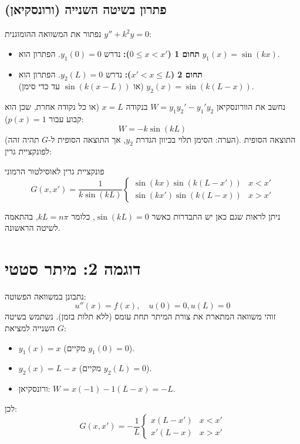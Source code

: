 \subsection{פתרון בשיטה השנייה (ורונסקיאן)}
נפתור את המשוואה ההומוגנית $y'' + k^2 y = 0$:
\begin{itemize}
    \item \textbf{תחום 1 ($0 \le x < x'$):} נדרש $y_1(0)=0$. הפתרון הוא $y_1(x) = \sin(kx)$.
    \item \textbf{תחום 2 ($x' < x \le L$):} נדרש $y_2(L)=0$. הפתרון הוא $y_2(x) = \sin(k(L-x))$ (או $\sin(k(x-L))$ עד כדי סימן).
\end{itemize}
נחשב את הוורונסקיאן $W = y_1 y_2' - y_1' y_2$ בנקודה $x=L$ (או כל נקודה אחרת, שכן הוא קבוע עבור $p(x)=1$):
\begin{equation}
    W = -k\sin(kL)
\end{equation}
(הערה: הסימן תלוי בכיוון הגדרת $y_2$, אך התוצאה הסופית ל-$G$ תהיה זהה).
התוצאה הסופית לפונקציית גרין:
\begin{resultbox}{פונקציית גרין לאוסילטור הרמוני}
    \begin{equation}
        G(x,x') = \frac{1}{k\sin(kL)} \begin{cases} 
            \sin(kx)\sin(k(L-x')) & x < x' \\
            \sin(kx')\sin(k(L-x)) & x > x'
        \end{cases}
    \end{equation}
\end{resultbox}
ניתן לראות שגם כאן יש התבדרות כאשר $\sin(kL)=0$, כלומר $kL = n\pi$, בהתאמה לשיטה הראשונה.

\section{דוגמה 2: מיתר סטטי}

נתבונן במשוואה הפשוטה:
\begin{equation}
    u''(x) = f(x), \quad u(0)=0, u(L)=0
\end{equation}
זוהי משוואה המתארת את צורת המיתר תחת עומס (ללא תלות בזמן).
נשתמש בשיטה השנייה למציאת $G$:
\begin{itemize}
    \item $y_1(x) = x$ (מקיים $y_1(0)=0$).
    \item $y_2(x) = L-x$ (מקיים $y_2(L)=0$).
    \item ורונסקיאן: $W = x(-1) - 1(L-x) = -L$.
\end{itemize}
לכן:
\begin{equation}
    G(x,x') = -\frac{1}{L} \begin{cases} x(L-x') & x < x' \\ x'(L-x) & x > x' \end{cases}
\end{equation}

